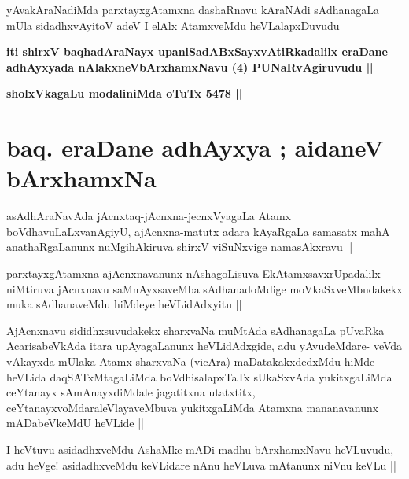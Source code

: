 \begin{artha}
yAvakAraNadiMda parxtayxgAtamxna dashaRnavu kAraNAdi sAdhanagaLa mUla
sidadhxvAyitoV adeV I elAlx AtamxveMdu heVLalapxDuvudu 
\end{artha}

\begin{center}
\textbf{iti shirxV baqhadAraNayx upaniSadABxSayxvAtiRkadalilx eraDane
adhAyxyada nAlakxneVbArxhamxNavu (4) PUNaRvAgiruvudu ||}

\textbf{sholxVkagaLu modaliniMda oTuTx 5478 ||}
\end{center}

\section*{baq. eraDane adhAyxya ; aidaneV bArxhamxNa }

\begin{artha}
asAdhAraNavAda jAcnxtaq-jAcnxna-jecnxVyagaLa Atamx
boVdhavuLaLxvanAgiyU, ajAcnxna-matutx adara kAyaRgaLa samasatx mahA
anathaRgaLanunx nuMgihAkiruva shirxV viSuNxvige namasAkxravu ||
\end{artha}

\begin{artha}
parxtayxgAtamxna ajAcnxnavanunx nAshagoLisuva EkAtamxsavxrUpadalilx
niMtiruva jAcnxnavu saMnAyxsaveMba sAdhanadoMdige moVkaSxveMbudakekx
muka sAdhanaveMdu hiMdeye heVLidAdxyitu ||
\end{artha}


\begin{artha}
AjAcnxnavu sididhxsuvudakekx sharxvaNa muMtAda sAdhanagaLa pUvaRka
AcarisabeVkAda itara upAyagaLanunx heVLidAdxgide, adu yAvudeMdare-
veVda vAkayxda mUlaka Atamx sharxvaNa (vicAra) maDatakakxdedxMdu hiMde
heVLida daqSATxMtagaLiMda boVdhisalapxTaTx sUkaSxvAda yukitxgaLiMda
ceYtanayx sAmAnayxdiMdale jagatitxna utatxtitx,
ceYtanayxvoMdaraleVlayaveMbuva yukitxgaLiMda Atamxna mananavanunx
mADabeVkeMdU heVLide ||
\end{artha}


\begin{artha}
I heVtuvu asidadhxveMdu AshaMke mADi madhu bArxhamxNavu heVLuvudu, adu
heVge! asidadhxveMdu keVLidare nAnu heVLuva mAtanunx niVnu keVLu ||
\end{artha}

